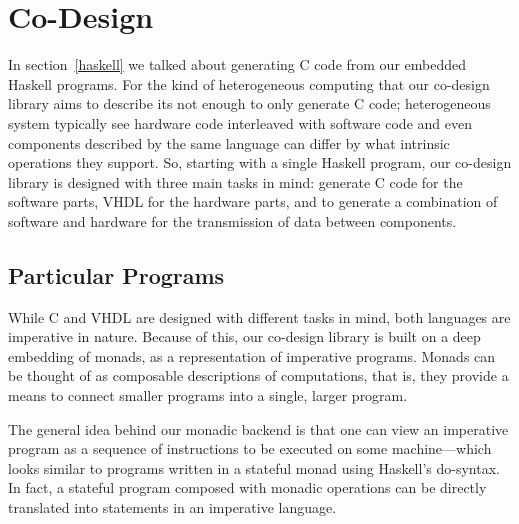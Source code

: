 \documentclass[../main.tex]{subfiles}
\begin{document}
\chapter{Co-Design}
\label{codesign}

In section~\ref{haskell} we talked about generating C code from our embedded Haskell programs. For the kind of heterogeneous computing that our co-design library aims to describe its not enough to only generate C code; heterogeneous system typically see hardware code interleaved with software code and even components described by the same language can differ by what intrinsic operations they support. So, starting with a single Haskell program, our co-design library is designed with three main tasks in mind: generate C code for the software parts, VHDL for the hardware parts, and to generate a combination of software and hardware for the transmission of data between components.


\section{Particular Programs}
\label{program}

While C and VHDL are designed with different tasks in mind, both languages are imperative in nature. Because of this, our co-design library is built on a deep embedding of monads, as a representation of imperative programs. Monads can be thought of as composable descriptions of computations, that is, they provide a means to connect smaller programs into a single, larger program.

The general idea behind our monadic backend is that one can view an imperative program as a sequence of instructions to be executed on some machine---which looks similar to programs written in a stateful monad using Haskell's do-syntax. In fact, a stateful program composed with monadic operations can be directly translated into statements in an imperative language.

\end{document}
